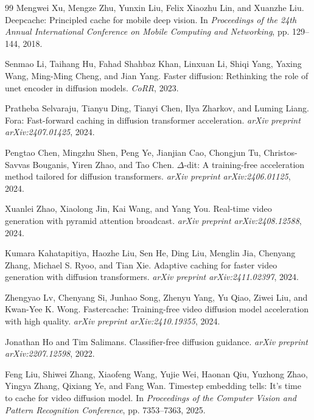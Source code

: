 \documentclass{article}
\begin{document}
\begin{thebibliography}{99}
Mengwei Xu, Mengze Zhu, Yunxin Liu, Felix Xiaozhu Lin, and Xuanzhe Liu.
\newblock Deepcache: Principled cache for mobile deep vision.
\newblock In \textit{Proceedings of the 24th Annual International Conference on Mobile Computing and Networking}, pp. 129--144, 2018.

Senmao Li, Taihang Hu, Fahad Shahbaz Khan, Linxuan Li, Shiqi Yang, Yaxing Wang, Ming-Ming Cheng, and Jian Yang.
\newblock Faster diffusion: Rethinking the role of unet encoder in diffusion models.
\newblock \textit{CoRR}, 2023.

Pratheba Selvaraju, Tianyu Ding, Tianyi Chen, Ilya Zharkov, and Luming Liang.
\newblock Fora: Fast-forward caching in diffusion transformer acceleration.
\newblock \textit{arXiv preprint arXiv:2407.01425}, 2024.

Pengtao Chen, Mingzhu Shen, Peng Ye, Jianjian Cao, Chongjun Tu, Christos-Savvas Bouganis, Yiren Zhao, and Tao Chen.
\newblock $\Delta$-dit: A training-free acceleration method tailored for diffusion transformers.
\newblock \textit{arXiv preprint arXiv:2406.01125}, 2024.

Xuanlei Zhao, Xiaolong Jin, Kai Wang, and Yang You.
\newblock Real-time video generation with pyramid attention broadcast.
\newblock \textit{arXiv preprint arXiv:2408.12588}, 2024.

Kumara Kahatapitiya, Haozhe Liu, Sen He, Ding Liu, Menglin Jia, Chenyang Zhang, Michael S. Ryoo, and Tian Xie.
\newblock Adaptive caching for faster video generation with diffusion transformers.
\newblock \textit{arXiv preprint arXiv:2411.02397}, 2024.

Zhengyao Lv, Chenyang Si, Junhao Song, Zhenyu Yang, Yu Qiao, Ziwei Liu, and Kwan-Yee K. Wong.
\newblock Fastercache: Training-free video diffusion model acceleration with high quality.
\newblock \textit{arXiv preprint arXiv:2410.19355}, 2024.

Jonathan Ho and Tim Salimans.
\newblock Classifier-free diffusion guidance.
\newblock \textit{arXiv preprint arXiv:2207.12598}, 2022.

Feng Liu, Shiwei Zhang, Xiaofeng Wang, Yujie Wei, Haonan Qiu, Yuzhong Zhao, Yingya Zhang, Qixiang Ye, and Fang Wan.
\newblock Timestep embedding tells: It's time to cache for video diffusion model.
\newblock In \textit{Proceedings of the Computer Vision and Pattern Recognition Conference}, pp. 7353--7363, 2025.



\end{thebibliography}
\end{document}
